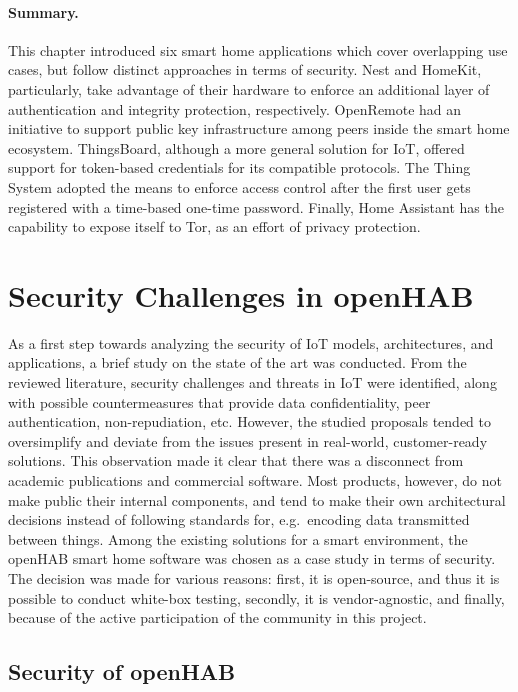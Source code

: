 \documentclass[12pt]{article}
\begin{document}
\paragraph{Summary.} This chapter introduced six smart home applications which cover overlapping use cases, but follow distinct approaches in terms of security. Nest and HomeKit, particularly, take advantage of their hardware to enforce an additional layer of authentication and integrity protection, respectively. OpenRemote had an initiative to support public key infrastructure among peers inside the smart home ecosystem. ThingsBoard, although a more general solution for IoT, offered support for token-based credentials for its compatible protocols. The Thing System adopted the means to enforce access control after the first user gets registered with a time-based one-time password. Finally, Home Assistant has the capability to expose itself to Tor, as an effort of privacy protection. 

\newpage
\section{Security Challenges in openHAB}
\label{sec:method}

As a first step towards analyzing the security of IoT models, architectures, and applications, a brief study on the state of the art was conducted. From the reviewed literature, security challenges and threats in IoT were identified, along with possible countermeasures that provide data confidentiality, peer authentication, non-repudiation, etc. However, the studied proposals tended to oversimplify and deviate from the issues present in real-world, customer-ready solutions. This observation made it clear that there was a disconnect from academic publications and commercial software. Most products, however, do not make public their internal components, and tend to make their own architectural decisions instead of following standards for, e.g.\ encoding data transmitted between things. Among the existing solutions for a smart environment, the openHAB smart home software was chosen as a case study in terms of security. The decision was made for various reasons: first, it is open-source, and thus it is possible to conduct white-box testing, secondly, it is vendor-agnostic, and finally, because of the active participation of the community in this project.

\subsection{Security of openHAB}
\end{document}
